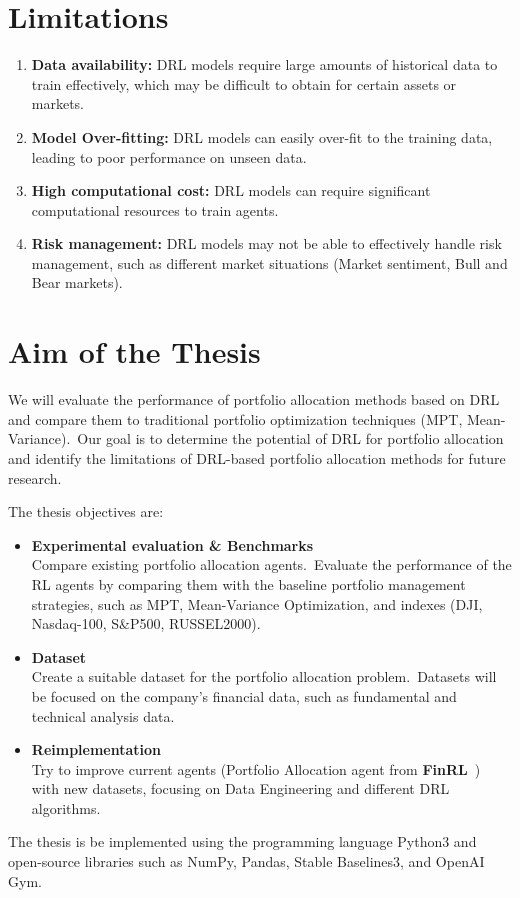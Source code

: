 \documentclass[../xlapes02]{subfiles}
\begin{document}
    \section{Limitations}\label{sec:limitations}

    \begin{enumerate}
        \item \textbf{Data availability:} DRL models require large amounts of historical data to train effectively, which may be difficult to obtain for certain assets or markets.
        \item \textbf{Model Over-fitting:} DRL models can easily over-fit to the training data, leading to poor performance on unseen data.
        \item \textbf{High computational cost:} DRL models can require significant computational resources to train agents.
        \item \textbf{Risk management:} DRL models may not be able to effectively handle risk management, such as different market situations (Market sentiment, Bull and Bear markets).
    \end{enumerate}


    \section{Aim of the Thesis}\label{sec:aim-of-the-thesis}
    We will evaluate the performance of portfolio allocation methods based on DRL and compare them to traditional portfolio optimization techniques (MPT, Mean-Variance).\ Our goal is to determine the potential of DRL for portfolio allocation and identify the limitations of DRL-based portfolio allocation methods for future research.

    The thesis objectives are:
    \begin{itemize}
        \item \textbf{Experimental evaluation \& Benchmarks}\\ Compare existing portfolio allocation agents.\ Evaluate the performance of the RL agents by comparing them with the baseline portfolio management strategies, such as MPT, Mean-Variance Optimization, and indexes (DJI, Nasdaq-100, S\&P500, RUSSEL2000).
        \item \textbf{Dataset}\\ Create a suitable dataset for the portfolio allocation problem.\ Datasets will be focused on the company's financial data, such as fundamental and technical analysis data.
        \item \textbf{Reimplementation}\\ Try to improve current agents (Portfolio Allocation agent from \textbf{FinRL}~\cite{finrl-portfolio-allocation-2020}) with new datasets, focusing on Data Engineering and different DRL algorithms.
    \end{itemize}

    The thesis is be implemented using the programming language Python3 and open-source libraries such as NumPy, Pandas, Stable Baselines3, and OpenAI Gym.
\end{document}
